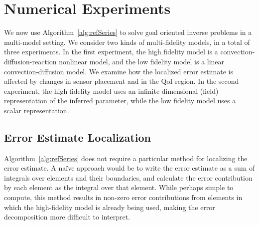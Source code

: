 \section{Numerical Experiments}\label{sect:numexp}
%
We now use Algorithm~\ref{alg:refSeries} to solve goal oriented inverse problems in a multi-model setting. We consider two kinds of multi-fidelity models, in a total of three experiments. In the first experiment, the high fidelity model is a convection-diffusion-reaction nonlinear model, and the low fidelity model is a linear convection-diffusion model. We examine how the localized error estimate is affected by changes in sensor placement and in the QoI region. In the second experiment, the high fidelity model uses an infinite dimensional (field) representation of the inferred parameter, while the low fidelity model uses a scalar representation. 


%
\subsection{Error Estimate Localization}
%
Algorithm~\ref{alg:refSeries} does not require a particular method for localizing the error estimate. A na\"{i}ve approach would be to write the error estimate as a sum of integrals over elements and their boundaries, and calculate the error contribution by each element as the integral over that element. While perhaps simple to compute, this method results in non-zero error contributions from elements in which the high-fidelity model is already being used, making the error decomposition more difficult to interpret.

